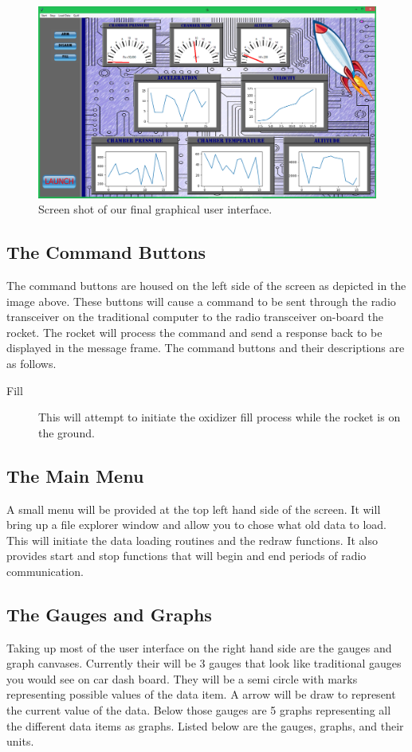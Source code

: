 \documentclass[10pt,draftclsnofoot,onecolumn,compsoc]{IEEEtran}
\begin{document}
\begin{figure}[!ht]
  \caption{Screen shot of our final graphical user interface.}
  \centering
	\includegraphics[scale=.45]{HyroGui}
\end{figure}

\subsection{The Command Buttons}
The command buttons are housed on the left side of the screen as depicted in the image above. These buttons will cause a command to be sent through the radio transceiver on the traditional computer to the radio transceiver on-board the rocket. The rocket will process the command and send a response back to be displayed in the message frame. The command buttons and their descriptions are as follows.\par

\begin{description}
\item[Fill] This will attempt to initiate the oxidizer fill process while the rocket is on the ground.
\end{description}

\subsection{The Main Menu}
A small menu will be provided at the top left hand side of the screen. It will bring up a file explorer window and allow you to chose what old data to load. This will initiate the data loading routines and the redraw functions. It also provides start and stop functions that will begin and end periods of radio communication. 

\subsection{The Gauges and Graphs}
Taking up most of the user interface on the right hand side are the gauges and graph canvases. Currently their will be 3 gauges that look like traditional gauges you would see on car dash board. They will be a semi circle with marks representing possible values of the data item. A arrow will be draw to represent the current value of the data. Below those gauges are 5 graphs representing all the different data items as graphs. Listed below are the gauges, graphs, and their units.
\end{document}
